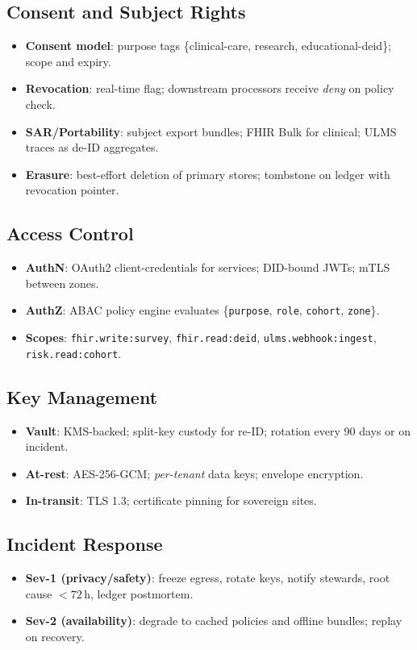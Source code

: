 \documentclass[11pt]{article}
\theoremstyle{plain}
\begin{document}
\subsection{Consent and Subject Rights}
\begin{itemize}
  \item \textbf{Consent model}: purpose tags \{clinical-care, research, educational-deid\}; scope and expiry.
  \item \textbf{Revocation}: real-time flag; downstream processors receive \emph{deny} on policy check.
  \item \textbf{SAR/Portability}: subject export bundles; FHIR Bulk for clinical; ULMS traces as de-ID aggregates.
  \item \textbf{Erasure}: best-effort deletion of primary stores; tombstone on ledger with revocation pointer.
\end{itemize}

\subsection{Access Control}
\begin{itemize}
  \item \textbf{AuthN}: OAuth2 client-credentials for services; DID-bound JWTs; mTLS between zones.
  \item \textbf{AuthZ}: ABAC policy engine evaluates \{\texttt{purpose}, \texttt{role}, \texttt{cohort}, \texttt{zone}\}.
  \item \textbf{Scopes}: \texttt{fhir.write:survey}, \texttt{fhir.read:deid}, \texttt{ulms.webhook:ingest}, \texttt{risk.read:cohort}.
\end{itemize}

\subsection{Key Management}
\begin{itemize}
  \item \textbf{Vault}: KMS-backed; split-key custody for re-ID; rotation every 90 days or on incident.
  \item \textbf{At-rest}: AES-256-GCM; \emph{per-tenant} data keys; envelope encryption.
  \item \textbf{In-transit}: TLS 1.3; certificate pinning for sovereign sites.
\end{itemize}

\subsection{Incident Response}
\begin{itemize}
  \item \textbf{Sev-1 (privacy/safety)}: freeze egress, rotate keys, notify stewards, root cause $<72$\,h, ledger postmortem.
  \item \textbf{Sev-2 (availability)}: degrade to cached policies and offline bundles; replay on recovery.
\end{itemize}
\end{document}
